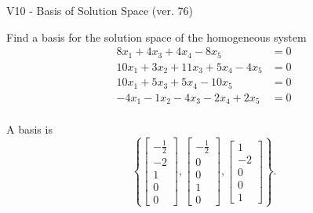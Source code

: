 \begin{exercise}
  \begin{exerciseTitle}V10 - Basis of Solution Space (ver. 76)\end{exerciseTitle}
  \begin{exerciseStatement}
    Find a basis for the solution space of the homogeneous system 
\begin{align*}
 8 x_ 1 + 4 x_ 3 + 4 x_ 4 -8 x_ 5 &= 0  \\ 
  10 x_ 1 + 3 x_ 2 + 11 x_ 3 + 5 x_ 4 -4 x_ 5 &= 0  \\ 
  10 x_ 1 + 5 x_ 3 + 5 x_ 4 -10 x_ 5 &= 0  \\ 
  -4 x_ 1 -1 x_ 2 -4 x_ 3 -2 x_ 4 + 2 x_ 5 &= 0  \\ 
 \end{align*}


 
  \end{exerciseStatement}

  \begin{exerciseAnswer}
   A basis is   
\[\left\{\left[\begin{array}{c}
-\frac{1}{2} \\
-2 \\
1 \\
0 \\
0
\end{array}\right] , \left[\begin{array}{c}
-\frac{1}{2} \\
0 \\
0 \\
1 \\
0
\end{array}\right] , \left[\begin{array}{c}
1 \\
-2 \\
0 \\
0 \\
1
\end{array}\right]\right\}.\]

  


  \end{exerciseAnswer}
\end{exercise}